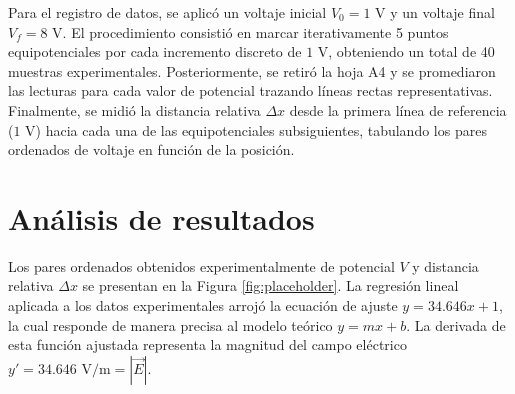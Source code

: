 \documentclass[12pt]{article}
\begin{document}
Para el registro de datos, se aplicó un voltaje inicial $V_0 = 1\text{ V}$ y un voltaje final $V_f = 8\text{ V}$. El procedimiento consistió en marcar iterativamente 5 puntos equipotenciales por cada incremento discreto de $1\text{ V}$, obteniendo un total de 40 muestras experimentales. Posteriormente, se retiró la hoja A4 y se promediaron las lecturas para cada valor de potencial trazando líneas rectas representativas. Finalmente, se midió la distancia relativa $\Delta x$ desde la primera línea de referencia ($1\text{ V}$) hacia cada una de las equipotenciales subsiguientes, tabulando los pares ordenados de voltaje en función de la posición.

\section{Análisis de resultados}
Los pares ordenados obtenidos experimentalmente de potencial $V$ y distancia relativa $\Delta x$ se presentan en la Figura \ref{fig:placeholder}. La regresión lineal aplicada a los datos experimentales arrojó la ecuación de ajuste $y = 34.646x + 1$, la cual responde de manera precisa al modelo teórico $y = mx + b$. La derivada de esta función ajustada representa la magnitud del campo eléctrico $y' = 34.646\text{ V/m} = |\overrightarrow{E}|$.
\end{document}
